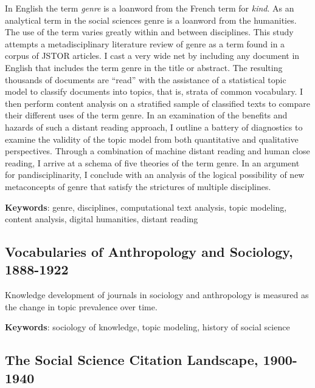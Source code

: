 \documentclass[]{book}
\theoremstyle{definition}
\theoremstyle{definition}
\theoremstyle{definition}
\theoremstyle{remark}
\begin{document}
In English the term \emph{genre} is a loanword from the
French term for \emph{kind}. As an analytical term in the social
sciences genre is a loanword from the humanities. The use of the term
varies greatly within and between disciplines. This study attempts a
metadisciplinary literature review of genre as a term found in a corpus
of JSTOR articles. I cast a very wide net by including any document in
English that includes the term genre in the title or abstract. The
resulting thousands of documents are ``read'' with the assistance of a
statistical topic model to classify documents into topics, that is,
strata of common vocabulary. I then perform content analysis on a
stratified sample of classified texts to compare their different uses of
the term genre. In an examination of the benefits and hazards of such a
distant reading approach, I outline a battery of diagnostics to examine
the validity of the topic model from both quantitative and qualitative
perspectives. Through a combination of machine distant reading and human
close reading, I arrive at a schema of five theories of the term genre.
In an argument for pandisciplinarity, I conclude with an analysis of the
logical possibility of new metaconcepts of genre that satisfy the
strictures of multiple disciplines.




\textbf{Keywords}: genre, disciplines, computational text analysis, topic
modeling, content analysis, digital humanities, distant reading

\hypertarget{vocabularies-of-anthropology-and-sociology-1888-1922}{%
\subsection*{Vocabularies of Anthropology and Sociology,
1888-1922}\label{vocabularies-of-anthropology-and-sociology-1888-1922}}




Knowledge development of journals in sociology and
anthropology is measured as the change in topic prevalence over time.




\textbf{Keywords}: sociology of knowledge, topic modeling, history of social
science

\hypertarget{the-social-science-citation-landscape-1900-1940}{%
\subsection*{The Social Science Citation Landscape,
1900-1940}\label{the-social-science-citation-landscape-1900-1940}}
\end{document}
